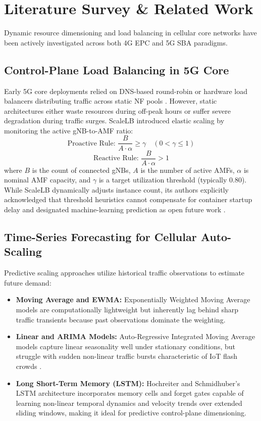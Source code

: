 \documentclass[conference]{IEEEtran}
\begin{document}
\section{Literature Survey \& Related Work}
Dynamic resource dimensioning and load balancing in cellular core networks have been actively investigated across both 4G EPC and 5G SBA paradigms.

\subsection{Control-Plane Load Balancing in 5G Core}
Early 5G core deployments relied on DNS-based round-robin or hardware load balancers distributing traffic across static NF pools \cite{nguyen2021}. However, static architectures either waste resources during off-peak hours or suffer severe degradation during traffic surges. ScaleLB \cite{scalelb} introduced elastic scaling by monitoring the active gNB-to-AMF ratio:
\begin{equation}
\text{Proactive Rule: } \frac{B}{A \cdot \alpha} \ge \gamma \quad (0 < \gamma \le 1)
\label{eq:scalelb_pro}
\end{equation}
\begin{equation}
\text{Reactive Rule: } \frac{B}{A \cdot \alpha} > 1
\label{eq:scalelb_react}
\end{equation}
where $B$ is the count of connected gNBs, $A$ is the number of active AMFs, $\alpha$ is nominal AMF capacity, and $\gamma$ is a target utilization threshold (typically 0.80). While ScaleLB dynamically adjusts instance count, its authors explicitly acknowledged that threshold heuristics cannot compensate for container startup delay and designated machine-learning prediction as open future work \cite{scalelb}.

\subsection{Time-Series Forecasting for Cellular Auto-Scaling}
Predictive scaling approaches utilize historical traffic observations to estimate future demand:
\begin{itemize}
    \item \textbf{Moving Average and EWMA:} Exponentially Weighted Moving Average models are computationally lightweight but inherently lag behind sharp traffic transients because past observations dominate the weighting.
    \item \textbf{Linear and ARIMA Models:} Auto-Regressive Integrated Moving Average models capture linear seasonality well under stationary conditions, but struggle with sudden non-linear traffic bursts characteristic of IoT flash crowds \cite{bello2021}.
    \item \textbf{Long Short-Term Memory (LSTM):} Hochreiter and Schmidhuber's LSTM architecture \cite{lstm1997} incorporates memory cells and forget gates capable of learning non-linear temporal dynamics and velocity trends over extended sliding windows, making it ideal for predictive control-plane dimensioning.
\end{itemize}
\end{document}

